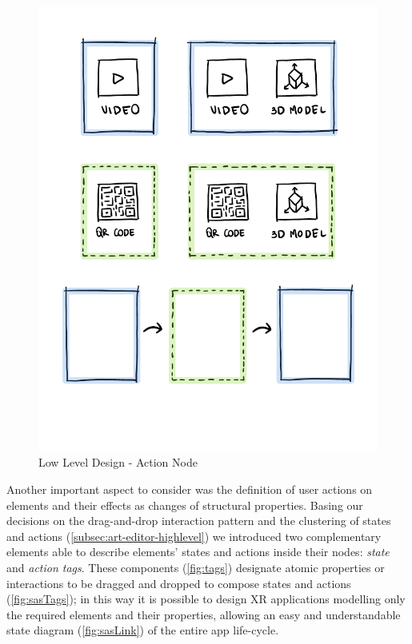 \begin{figure}[h]
    \centering
    \includegraphics[width=\textwidth]{Figures/Editor/wireframes/actionNode.png}
    \caption{Low Level Design - Action Node}
    \label{fig:actionNode}
\end{figure}

Another important aspect to consider was the definition of user actions on elements and their effects as changes of structural properties. Basing our decisions on the drag-and-drop interaction pattern and the clustering of states and actions (\autoref{subsec:art-editor-highlevel}) we introduced two complementary elements able to describe elements' states and actions inside their nodes: \emph{state} and \emph{action tags}. These components (\autoref{fig:tags}) designate atomic properties or interactions to be dragged and dropped to compose states and actions (\autoref{fig:sasTags}); in this way it is possible to design XR applications modelling only the required elements and their properties, allowing an easy and understandable state diagram (\autoref{fig:sasLink}) of the entire app life-cycle.

